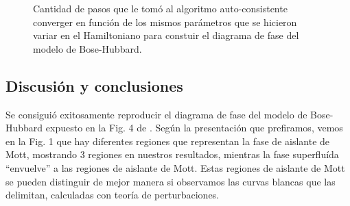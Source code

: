 \documentclass[11pt,letterpaper]{article}
\begin{document}
\begin{figure}
\centering
{}
\caption{Cantidad de pasos que le tomó al algoritmo auto-consistente
converger en función de los mismos parámetros que se hicieron variar 
en el Hamiltoniano para constuir el diagrama de fase del modelo de
Bose-Hubbard.}
\end{figure}


\subsection{Discusión y conclusiones}
Se consiguió exitosamente reproducir el diagrama de fase del 
modelo de Bose-Hubbard expuesto en la Fig. 4 de \cite{caballero2022materia}.
Según la presentación que prefiramos, vemos en la Fig. 1 que hay diferentes
regiones que representan la fase de aislante de Mott, mostrando 3 regiones 
en nuestros resultados, mientras la fase superfluída ``envuelve'' a las
regiones de aislante de Mott. Estas regiones de aislante de Mott se pueden
distinguir de mejor manera si observamos las curvas blancas que las delimitan,
calculadas con teoría de perturbaciones. 
\end{document}
